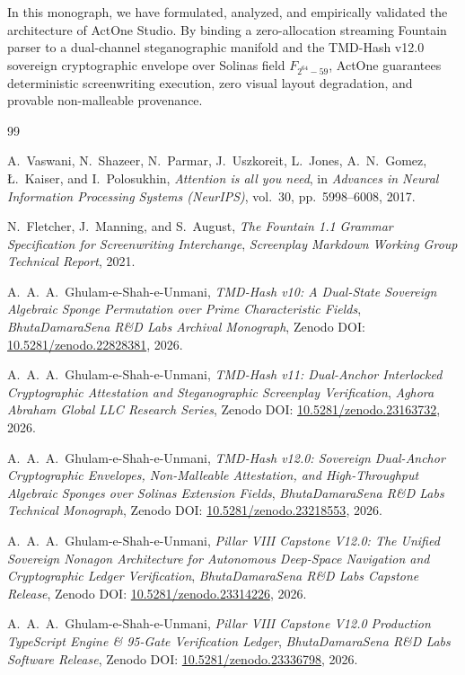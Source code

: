 \documentclass[11pt,a4paper,reqno]{article}
\newcommand{\zenodo}[1]{\href{https://doi.org/10.5281/zenodo.#1}{\texttt{10.5281/\allowbreak zenodo.#1}}}
\def\texttt#1{#1}%
\def\mathbb#1{#1}%
\theoremstyle{plain}
\theoremstyle{definition}
\theoremstyle{remark}
\numberwithin{equation}{section}
\begin{document}
In this monograph, we have formulated, analyzed, and empirically validated the architecture of ActOne Studio. By binding a zero-allocation streaming Fountain parser to a dual-channel steganographic manifold and the TMD-Hash v12.0 sovereign cryptographic envelope over Solinas field $\mathbb{F}_{2^{64}-59}$, ActOne guarantees deterministic screenwriting execution, zero visual layout degradation, and provable non-malleable provenance.

\begin{thebibliography}{99}

A.~Vaswani, N.~Shazeer, N.~Parmar, J.~Uszkoreit, L.~Jones, A.~N.~Gomez, \L.~Kaiser, and I.~Polosukhin,
\emph{Attention is all you need},
in \emph{Advances in Neural Information Processing Systems (NeurIPS)}, vol.~30, pp.~5998--6008, 2017.

N.~Fletcher, J.~Manning, and S.~August,
\emph{The Fountain 1.1 Grammar Specification for Screenwriting Interchange},
\emph{Screenplay Markdown Working Group Technical Report}, 2021.

A.~A.~A.~Ghulam-e-Shah-e-Unmani,
\emph{TMD-Hash v10: A Dual-State Sovereign Algebraic Sponge Permutation over Prime Characteristic Fields},
\emph{BhutaDamaraSena R\&D Labs Archival Monograph}, Zenodo DOI: \zenodo{22828381}, 2026.

A.~A.~A.~Ghulam-e-Shah-e-Unmani,
\emph{TMD-Hash v11: Dual-Anchor Interlocked Cryptographic Attestation and Steganographic Screenplay Verification},
\emph{Aghora Abraham Global LLC Research Series}, Zenodo DOI: \zenodo{23163732}, 2026.

A.~A.~A.~Ghulam-e-Shah-e-Unmani,
\emph{TMD-Hash v12.0: Sovereign Dual-Anchor Cryptographic Envelopes, Non-Malleable Attestation, and High-Throughput Algebraic Sponges over Solinas Extension Fields},
\emph{BhutaDamaraSena R\&D Labs Technical Monograph}, Zenodo DOI: \zenodo{23218553}, 2026.

A.~A.~A.~Ghulam-e-Shah-e-Unmani,
\emph{Pillar VIII Capstone V12.0: The Unified Sovereign Nonagon Architecture for Autonomous Deep-Space Navigation and Cryptographic Ledger Verification},
\emph{BhutaDamaraSena R\&D Labs Capstone Release}, Zenodo DOI: \zenodo{23314226}, 2026.

A.~A.~A.~Ghulam-e-Shah-e-Unmani,
\emph{Pillar VIII Capstone V12.0 Production TypeScript Engine \& 95-Gate Verification Ledger},
\emph{BhutaDamaraSena R\&D Labs Software Release}, Zenodo DOI: \zenodo{23336798}, 2026.


\end{thebibliography}
\end{document}
